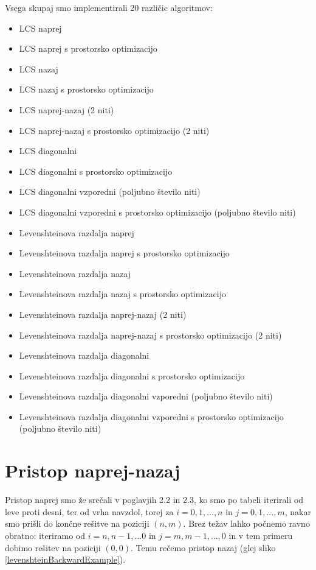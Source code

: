 \documentclass[a4paper,12pt,openright]{book}
\begin{document}
Vsega skupaj smo implementirali 20 različic algoritmov:
\begin{itemize}
  \item LCS naprej 
  \item LCS naprej s prostorsko optimizacijo
  \item LCS nazaj 
  \item LCS nazaj s prostorsko optimizacijo
  \item LCS naprej-nazaj (2 niti)
  \item LCS naprej-nazaj s prostorsko optimizacijo (2 niti)
  \item LCS diagonalni
  \item LCS diagonalni s prostorsko optimizacijo
  \item LCS diagonalni vzporedni (poljubno število niti)
  \item LCS diagonalni vzporedni s prostorsko optimizacijo (poljubno število niti)
  \item Levenshteinova razdalja naprej 
  \item Levenshteinova razdalja naprej s prostorsko optimizacijo
  \item Levenshteinova razdalja nazaj 
  \item Levenshteinova razdalja nazaj s prostorsko optimizacijo
  \item Levenshteinova razdalja naprej-nazaj (2 niti)
  \item Levenshteinova razdalja naprej-nazaj s prostorsko optimizacijo (2 niti)
  \item Levenshteinova razdalja diagonalni
  \item Levenshteinova razdalja diagonalni s prostorsko optimizacijo
  \item Levenshteinova razdalja diagonalni vzporedni (poljubno število niti)
  \item Levenshteinova razdalja diagonalni vzporedni s prostorsko optimizacijo (poljubno število niti)
\end{itemize}

\section{Pristop naprej-nazaj}

Pristop naprej smo že srečali v poglavjih 2.2 in 2.3, ko smo po tabeli iterirali od leve proti desni, ter od vrha navzdol, torej za $i = 0, 1, ..., n$ in $j = 0, 1, ..., m$, nakar smo prišli do končne rešitve na poziciji $(n, m)$. Brez težav lahko počnemo ravno obratno: iteriramo od $i = n, n-1, ... 0$ in $j = m, m-1, ..., 0$ in v tem primeru dobimo rešitev na poziciji $(0, 0)$. Temu rečemo pristop nazaj (glej sliko \ref{levenshteinBackwardExample}). 
\end{document}
